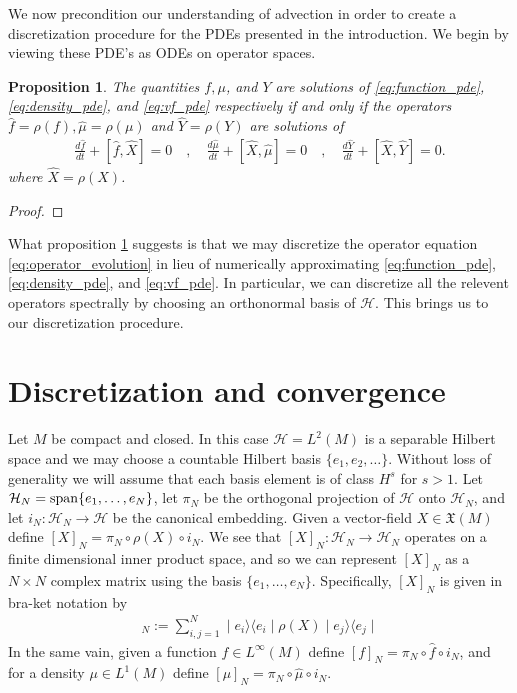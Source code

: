 \documentclass[12pt]{amsart}
\renewcommand{\H}{\ensuremath{\mathcal{H}}}
\newtheorem{prop}[thm]{Proposition}
\begin{document}
We now precondition our understanding of advection in order to create 
a discretization procedure for the PDEs presented in the introduction.
We begin by viewing these PDE's as ODEs on operator spaces.
\begin{prop}\label{prop:operator}
	The quantities $f,\mu$, and $Y$ are solutions of \eqref{eq:function_pde}, \eqref{eq:density_pde}, and \eqref{eq:vf_pde} respectively
	if and only if the operators $\hat{f} = \rho(f),\hat{\mu} = \rho(\mu)$ and $\widehat{Y} = \rho(Y)$ are solutions of
	\begin{align} \label{eq:operator_evolution}
		\frac{d\hat{f}}{dt} + [ \hat{f} , \widehat{X} ] = 0 \quad,\quad
		\frac{d\hat{\mu}}{dt} + [ \widehat{X}, \hat{\mu} ] = 0 \quad,\quad
		\frac{d\widehat{Y}}{dt} + [ \widehat{X} , \widehat{Y} ] = 0.
	\end{align}
	where $\widehat{X} = \rho(X)$.
\end{prop}
\begin{proof}
\end{proof}
What proposition \ref{prop:operator} suggests is that we may discretize the operator equation \eqref{eq:operator_evolution} in lieu of numerically approximating  \eqref{eq:function_pde}, \eqref{eq:density_pde}, and \eqref{eq:vf_pde}.
In particular, we can discretize all the relevent operators spectrally by choosing an orthonormal basis of $\mathcal{H}$.
This brings us to our discretization procedure.

\section{Discretization and convergence}
\label{sec:discretization}
Let $M$ be compact and closed.  In this case $\H = L^2(M)$ is a separable Hilbert space
and we may choose a countable Hilbert basis $\{ e_1 , e_2 , \dots \}$.
Without loss of generality we will assume that each basis element is of class $H^s$ for $s > 1$.
Let $\H_N = {\rm span}\{ e_1, \dots ,e_N \}$, let
$\pi_N$ be the orthogonal projection of $\H$ onto $\H_N$,
 and let $i_N: \H_N \to \H$ be the canonical embedding.
Given a vector-field $X \in \mathfrak{X}(M)$ define $[X]_N = \pi_N \circ \rho(X) \circ i_N$.
We see that $[X]_N : \H_N \to \H_N$ 
operates on a finite dimensional inner product space,
and so we can represent $[X]_N$ as a $N\times N$ complex matrix using 
the basis $\{ e_1,\dots, e_N\}$.
Specifically, $[X]_N$ is given in bra-ket notation by
\begin{align*}
	[X]_N:= \sum_{i,j = 1}^{N} \mid e_i \rangle \langle e_i \mid \rho(X) \mid e_j \rangle  \langle e_j \mid
\end{align*}
In the same vain, given a function $f \in L^\infty(M)$ define $[f]_N = \pi_N \circ \hat{f} \circ i_N$,
and for a density $\mu \in L^1(M)$ define $[\mu]_N = \pi_N \circ \hat{\mu} \circ i_N$.
\end{document}
